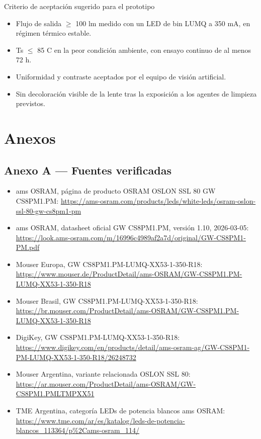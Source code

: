 \documentclass[11pt,a4paper]{article}
\newenvironment{detalle}[1]{\begin{detallebase}{#1}}{\end{detallebase}}
\begin{document}
\begin{detalle}{Criterio de aceptación sugerido para el prototipo}
\begin{itemize}
\item Flujo de salida $\geq$ 100 lm medido con un LED de bin LUMQ a 350 mA, en régimen térmico estable.
\item Ts $\leq$ 85 \textdegree{}C en la peor condición ambiente, con ensayo continuo de al menos 72 h.
\item Uniformidad y contraste aceptados por el equipo de visión artificial.
\item Sin decoloración visible de la lente tras la exposición a los agentes de limpieza previstos.
\end{itemize}

\end{detalle}
\clearpage

\section*{Anexos}


\subsection*{Anexo A — Fuentes verificadas}

\begin{itemize}
\item ams OSRAM, página de producto OSRAM OSLON SSL 80 GW CS8PM1.PM: \url{https://ams-osram.com/products/leds/white-leds/osram-oslon-ssl-80-gw-cs8pm1-pm}
\item ams OSRAM, datasheet oficial GW CS8PM1.PM, versión 1.10, 2026-03-05: \url{https://look.ams-osram.com/m/16996c4989af2a7d/original/GW-CS8PM1-PM.pdf}
\item Mouser Europa, GW CS8PM1.PM-LUMQ-XX53-1-350-R18: \url{https://www.mouser.de/ProductDetail/ams-OSRAM/GW-CS8PM1.PM-LUMQ-XX53-1-350-R18}
\item Mouser Brasil, GW CS8PM1.PM-LUMQ-XX53-1-350-R18: \url{https://br.mouser.com/ProductDetail/ams-OSRAM/GW-CS8PM1.PM-LUMQ-XX53-1-350-R18}
\item DigiKey, GW CS8PM1.PM-LUMQ-XX53-1-350-R18: \url{https://www.digikey.com/en/products/detail/ams-osram-ag/GW-CS8PM1-PM-LUMQ-XX53-1-350-R18/26248732}
\item Mouser Argentina, variante relacionada OSLON SSL 80: \url{https://ar.mouser.com/ProductDetail/ams-OSRAM/GW-CS8PM1.PMLTMPXX51}
\item TME Argentina, categoría LEDs de potencia blancos ams OSRAM: \url{https://www.tme.com/ar/es/katalog/leds-de-potencia-blancos_113364/p%2Cams-osram_114/}
\end{itemize}
\end{document}
